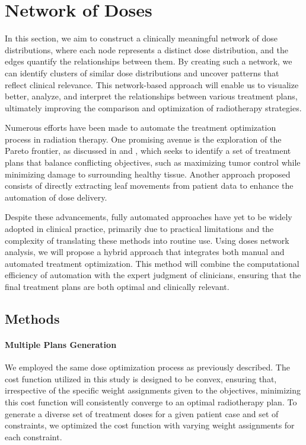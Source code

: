 \section{Network of Doses}
In this section, we aim to construct a clinically meaningful network of dose distributions, where each node represents a distinct dose distribution, and the edges quantify the relationships between them.
By creating such a network, we can identify clusters of similar dose distributions and uncover patterns that reflect clinical relevance.
This network-based approach will enable us to visualize better, analyze, and interpret the relationships between various treatment plans, ultimately improving the comparison and optimization of radiotherapy strategies.

Numerous efforts have been made to automate the treatment optimization process in radiation therapy.
One promising avenue is the exploration of the Pareto frontier, as discussed in \cite{Kuipers2023} and \cite{Ottosson_2010}, which seeks to identify a set of treatment plans that balance conflicting objectives, such as maximizing tumor control while minimizing damage to surrounding healthy tissue.
Another approach proposed \cite{CristianCotrutz_2003} consists of directly extracting leaf movements from patient data to enhance the automation of dose delivery.

Despite these advancements, fully automated approaches have yet to be widely adopted in clinical practice, primarily due to practical limitations and the complexity of translating these methods into routine use.
Using doses network analysis, we will propose a hybrid approach that integrates both manual and automated treatment optimization.
This method will combine the computational efficiency of automation with the expert judgment of clinicians, ensuring that the final treatment plans are both optimal and clinically relevant.

\subsection{Methods}

\paragraph{Multiple Plans Generation}
We employed the same dose optimization process as previously described.
The cost function utilized in this study is designed to be convex, ensuring that, irrespective of the specific weight assignments given to the objectives, minimizing this cost function will consistently converge to an optimal radiotherapy plan.
To generate a diverse set of treatment doses for a given patient case and set of constraints, we optimized the cost function with varying weight assignments for each constraint.

